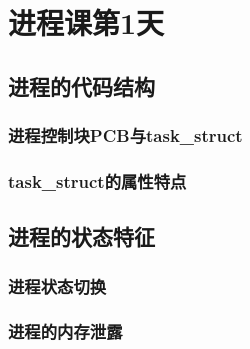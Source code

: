 

\partabstractrp{}
\partabstractlettrine{}{} %

\part{进程课第1天}

\chapter{进程的代码结构}
\section{进程控制块PCB与task\_struct}
\section{task\_struct的属性特点}


\chapter{进程的状态特征}

\section{进程状态切换}
\section{进程的内存泄露}

